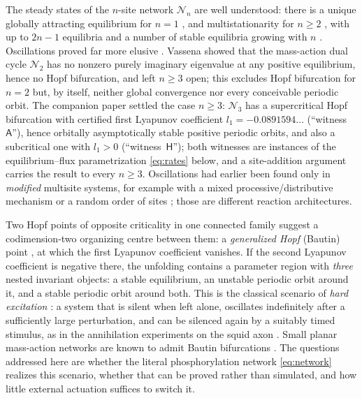 \documentclass[11pt,a4paper]{article}
\theoremstyle{plain}
\theoremstyle{definition}
\theoremstyle{remark}
\newcommand{\cN}{\mathcal N}
\begin{document}
The steady states of the $n$-site network $\cN_n$ are well understood: there is a unique globally attracting equilibrium for $n=1$ \cite{AngeliSontag08}, and multistationarity for $n\ge2$ \cite{Markevich04,WangSontag08a,ConradiMincheva14,HellRendall15}, with up to $2n-1$ equilibria \cite{WangSontag08a,Flockerzi14} and a number of stable equilibria growing with $n$ \cite{ThomsonGunawardena09,FeliuRendallWiuf20}. Oscillations proved far more elusive \cite{ConradiShiu18,ConradiFeliuMincheva20,FeliuKaihnsa26}. Vassena \cite{Vassena26} showed that the mass-action dual cycle $\cN_2$ has no nonzero purely imaginary eigenvalue at any positive equilibrium, hence no Hopf bifurcation, and left $n\ge3$ open; this excludes Hopf bifurcation for $n=2$ but, by itself, neither global convergence nor every conceivable periodic orbit. The companion paper \cite{CompanionOscillations} settled the case $n\ge3$: $\cN_3$ has a supercritical Hopf bifurcation with certified first Lyapunov coefficient $l_1=-0.0891594\ldots$ (``witness~$\mathsf A$''), hence orbitally asymptotically stable positive periodic orbits, and also a subcritical one with $l_1>0$ (``witness~$\mathsf H$''); both witnesses are instances of the equilibrium--flux parametrization \eqref{eq:rates} below, and a site-addition argument carries the result to every $n\ge3$. Oscillations had earlier been found only in \emph{modified} multisite systems, for example with a mixed processive/distributive mechanism \cite{SuwanmajoKrishnan15,ConradiMinchevaShiu19} or a random order of sites \cite{Jolley12}; those are different reaction architectures.

Two Hopf points of opposite criticality in one connected family suggest a codimension-two organizing centre between them: a \emph{generalized Hopf} (Bautin) point \cite{Bautin52,Takens73,GolubitskyLangford81,Kuznetsov23}, at which the first Lyapunov coefficient vanishes. If the second Lyapunov coefficient is negative there, the unfolding contains a parameter region with \emph{three} nested invariant objects: a stable equilibrium, an unstable periodic orbit around it, and a stable periodic orbit around both. This is the classical scenario of \emph{hard excitation} \cite{Goldbeter96}: a system that is silent when left alone, oscillates indefinitely after a sufficiently large perturbation, and can be silenced again by a suitably timed stimulus, as in the annihilation experiments on the squid axon \cite{GuttmanLewisRinzel80,Winfree01}. Small planar mass-action networks are known to admit Bautin bifurcations \cite{BanajiBorosHofbauer24}. The questions addressed here are whether the literal phosphorylation network \eqref{eq:network} realizes this scenario, whether that can be proved rather than simulated, and how little external actuation suffices to switch it.
\end{document}
